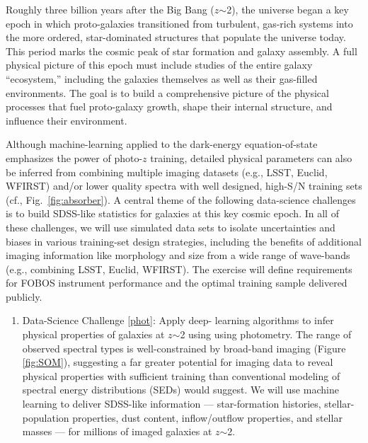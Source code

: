 \documentclass[oneside,11pt]{amsart}
\newcounter{chalno}
\newcommand{\chal}[1]{\refstepcounter{chalno}\label{#1}}
\begin{document}
Roughly three billion years after the Big Bang ($z$$\sim$2), the
universe began a key epoch in which proto-galaxies transitioned from
turbulent, gas-rich systems into the more ordered, star-dominated
structures that populate the universe today.  This period marks the
cosmic peak of star formation and galaxy assembly.   A full physical
picture of this epoch must include studies of the entire galaxy
``ecosystem,'' including the galaxies themselves as well as their
gas-filled environments.  The goal is to build a comprehensive picture
of the physical processes that fuel proto-galaxy growth, shape their
internal structure, and influence their environment.

Although machine-learning applied to the dark-energy equation-of-state
emphasizes the power of photo-$z$ training, detailed physical parameters
can also be inferred from combining multiple imaging datasets (e.g.,
LSST, Euclid, WFIRST) and/or lower quality spectra with well designed,
high-S/N training sets (cf., Fig.~\ref{fig:absorber}).  A central theme
of the following data-science challenges is to build SDSS-like
statistics for galaxies at this key cosmic epoch.  In all of these
challenges, we will use simulated data sets to isolate uncertainties and
biases in various training-set design strategies, including the benefits
of additional imaging information like morphology and size from a wide
range of wave-bands (e.g., combining LSST, Euclid, WFIRST).  The
exercise will define requirements for FOBOS instrument performance and
the optimal training sample delivered publicly.


\begin{enumerate}[rightmargin=0.2cm,leftmargin=0.2cm]
%
\chal{phot}
%
\item[] {\textsf {\large Data-Science Challenge \ref{phot}: Apply deep-
learning algorithms to infer physical properties of galaxies at
$z$$\sim$2 using using photometry.}} The range of observed spectral
types is well-constrained by broad-band imaging (Figure \ref{fig:SOM}),
suggesting a far greater potential for imaging data to reveal physical
properties with sufficient training than conventional modeling of
spectral energy distributions (SEDs) would suggest.  We will use machine
learning to deliver SDSS-like information --- star-formation histories,
stellar-population properties, dust content, inflow/outflow properties,
and stellar masses --- for millions of imaged galaxies at $z$$\sim$2.
%
\end{enumerate}
\end{document}
